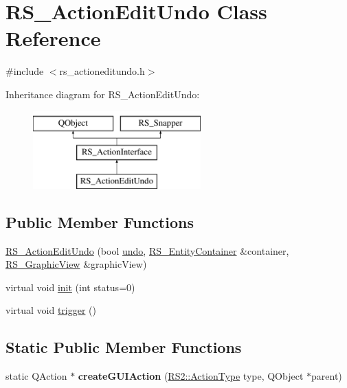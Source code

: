 \hypertarget{classRS__ActionEditUndo}{\section{R\-S\-\_\-\-Action\-Edit\-Undo Class Reference}
\label{classRS__ActionEditUndo}
}


{\ttfamily \#include $<$rs\-\_\-actioneditundo.\-h$>$}

Inheritance diagram for R\-S\-\_\-\-Action\-Edit\-Undo\-:\begin{figure}[H]
\begin{center}
\leavevmode
\includegraphics[height=3.000000cm]{classRS__ActionEditUndo}
\end{center}
\end{figure}
\subsection*{Public Member Functions}
\begin{DoxyCompactItemize}
\item 
\hyperlink{classRS__ActionEditUndo_a6d2c96a013233ad96fbada3dd6adb4d4}{R\-S\-\_\-\-Action\-Edit\-Undo} (bool \hyperlink{classRS__ActionEditUndo_a0c6bc1f9d62c298e08880c2764e0e73f}{undo}, \hyperlink{classRS__EntityContainer}{R\-S\-\_\-\-Entity\-Container} \&container, \hyperlink{classRS__GraphicView}{R\-S\-\_\-\-Graphic\-View} \&graphic\-View)
\item 
virtual void \hyperlink{classRS__ActionEditUndo_ac16d63e9cb73749e348a28e08674095e}{init} (int status=0)
\item 
virtual void \hyperlink{classRS__ActionEditUndo_af9128469b322f20bbee3423cbfcac178}{trigger} ()
\end{DoxyCompactItemize}
\subsection*{Static Public Member Functions}
\begin{DoxyCompactItemize}
\item 
\hypertarget{classRS__ActionEditUndo_acae2228aa70a6aaab30edf61d1ebe2d8}{static Q\-Action $\ast$ {\bfseries create\-G\-U\-I\-Action} (\hyperlink{classRS2_afe3523e0bc41fd637b892321cfc4b9d7}{R\-S2\-::\-Action\-Type} type, Q\-Object $\ast$parent)}\label{classRS__ActionEditUndo_acae2228aa70a6aaab30edf61d1ebe2d8}

\end{DoxyCompactItemize}
